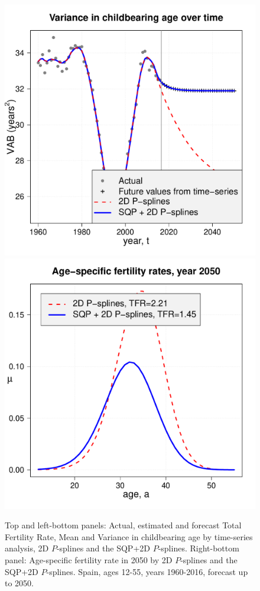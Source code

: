 \documentclass[a4paper,twoside, openright, 12pt, leqno]{article}
\begin{document}
\begin{figure}[!ht]
	\includegraphics[scale=0.25]{Figures/CamardaVAB.pdf}
	\includegraphics[scale=0.25]{Figures/CamardaFert2050.pdf}
	\caption{\label{fig:CamardaFert} Top and left-bottom panels: Actual, estimated and forecast Total Fertility Rate, Mean and Variance in childbearing age by time-series analysis, 2D $P$-splines and the SQP+2D $P$-splines. Right-bottom panel: Age-specific fertility rate in 2050 by 2D $P$-splines and the SQP+2D $P$-splines. Spain, ages 12-55, years 1960-2016, forecast up to 2050.}
\end{figure}
\end{document}
